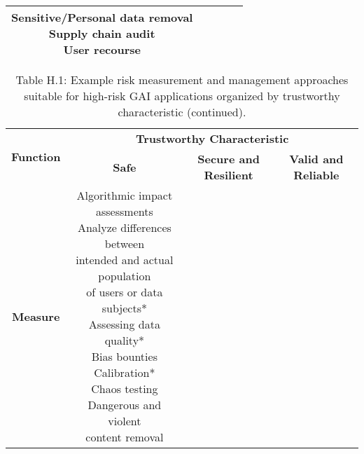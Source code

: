 \documentclass[fleqn]{article}
\begin{document}
\begin{landscape}
\begin{table}[H]
\begin{tabular}{|c|c|c|c|c|}
{			\textbullet\hspace{3pt} Sensitive/Personal data removal \\ 	
			\textbullet\hspace{3pt} Supply chain audit \\ 	
			\textbullet\hspace{3pt} User recourse \\   		 
		}
		\\
		\hline
	\end{tabular}
	\label{table:high_risk_plan_by_tc}
\end{table}

\vfill
\raisebox{-10pt}{\makebox[\linewidth]{\thepage}}

\pagebreak
\thispagestyle{empty}

\begin{table}[H]
	\caption*{Table H.1: Example risk measurement and management approaches suitable for high-risk GAI applications organized by trustworthy characteristic (continued).}
	\footnotesize
	\begin{tabular}{|c|c|c|c|}
		\hline
		\multirow{2}{*}{\textbf{Function}} & \multicolumn{3}{|c|}{\textbf{Trustworthy Characteristic}}   \\
		\cline{2-4}
		& \textbf{Safe} & \textbf{Secure and Resilient} & \textbf{Valid and Reliable} \\
		\hline
		\textbf{Measure} & \makecell[l]{
			\textbullet\hspace{3pt} Algorithmic impact assessments\\  	
			\textbullet\hspace{3pt} Analyze differences between\\\hspace{10pt}intended and actual population\\\hspace{10pt}of users or data subjects*\\ 	 	
			\textbullet\hspace{3pt} Assessing data quality*\\  	 	
			\textbullet\hspace{3pt} Bias bounties\\  	
			\textbullet\hspace{3pt} Calibration*\\  	
			\textbullet\hspace{3pt} Chaos testing\\  	
			\textbullet\hspace{3pt} Dangerous and violent
			\\\hspace{10pt}content removal\\  		
}
\end{tabular}
\end{table}
\end{landscape}
\end{document}
